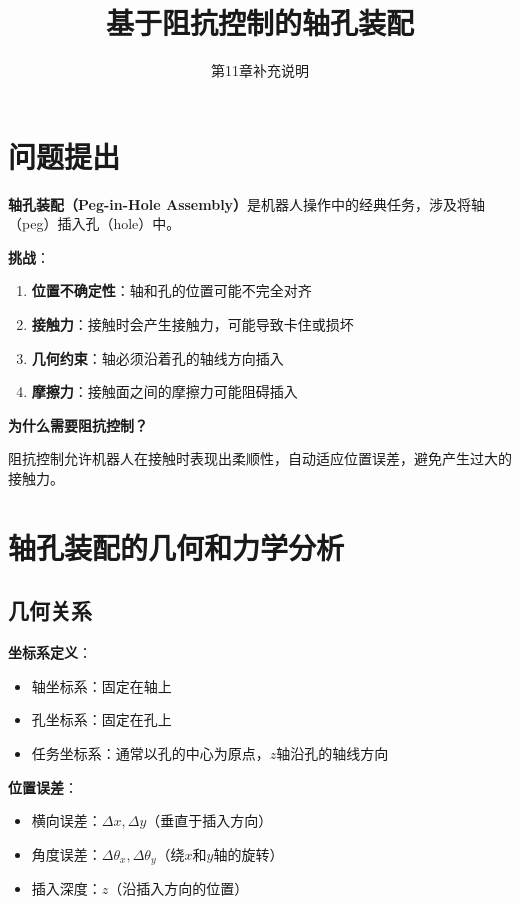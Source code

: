 \documentclass[12pt,a4paper]{article}
\title{基于阻抗控制的轴孔装配}
\author{第11章补充说明}
\date{}
\begin{document}
\maketitle

\section{问题提出}

\textbf{轴孔装配（Peg-in-Hole Assembly）}是机器人操作中的经典任务，涉及将轴（peg）插入孔（hole）中。

\textbf{挑战}：
\begin{enumerate}
\item \textbf{位置不确定性}：轴和孔的位置可能不完全对齐
\item \textbf{接触力}：接触时会产生接触力，可能导致卡住或损坏
\item \textbf{几何约束}：轴必须沿着孔的轴线方向插入
\item \textbf{摩擦力}：接触面之间的摩擦力可能阻碍插入
\end{enumerate}

\textbf{为什么需要阻抗控制？}

阻抗控制允许机器人在接触时表现出柔顺性，自动适应位置误差，避免产生过大的接触力。

\section{轴孔装配的几何和力学分析}

\subsection{几何关系}

\textbf{坐标系定义}：
\begin{itemize}
\item 轴坐标系：固定在轴上
\item 孔坐标系：固定在孔上
\item 任务坐标系：通常以孔的中心为原点，$z$轴沿孔的轴线方向
\end{itemize}

\textbf{位置误差}：
\begin{itemize}
\item 横向误差：$\Delta x, \Delta y$（垂直于插入方向）
\item 角度误差：$\Delta \theta_x, \Delta \theta_y$（绕$x$和$y$轴的旋转）
\item 插入深度：$z$（沿插入方向的位置）
\end{itemize}
\end{document}
